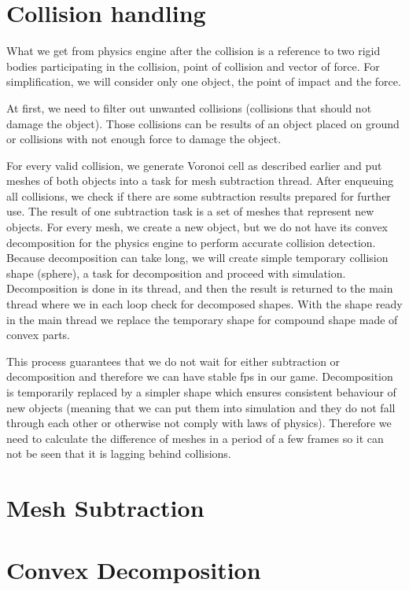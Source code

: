 \section{Collision handling}
\label{sec:collisions}
What we get from physics engine after the collision is a reference to two rigid bodies participating in the collision, point of collision and vector of force. For simplification, we will consider only one object, the point of impact and the force.

At first, we need to filter out unwanted collisions (collisions that should not damage the object). Those collisions can be results of an object placed on ground or collisions with not enough force to damage the object. 

For every valid collision, we generate Voronoi cell as described earlier and put meshes of both objects into a task for mesh subtraction thread. After enqueuing all collisions, we check if there are some subtraction results prepared for further use. The result of one subtraction task is a set of meshes that represent new objects. For every mesh, we create a new object, but we do not have its convex decomposition for the physics engine to perform accurate collision detection. Because decomposition can take long, we will create simple temporary collision shape (\eg sphere), a task for decomposition and proceed with simulation. Decomposition is done in its thread, and then the result is returned to the main thread where we in each loop check for decomposed shapes. With the shape ready in the main thread we replace the temporary shape for compound shape made of convex parts.

This process guarantees that we do not wait for either subtraction or decomposition and therefore we can have stable fps in our game. Decomposition is temporarily replaced by a simpler shape which ensures consistent behaviour of new objects (meaning that we can put them into simulation and they do not fall through each other or otherwise not comply with laws of physics). Therefore we need to calculate the difference of meshes in a period of a few frames so it can not be seen that it is lagging behind collisions.


\section{Mesh Subtraction}
\label{sec:subtraction}

\section{Convex Decomposition}
\label{sec:decomposition}




